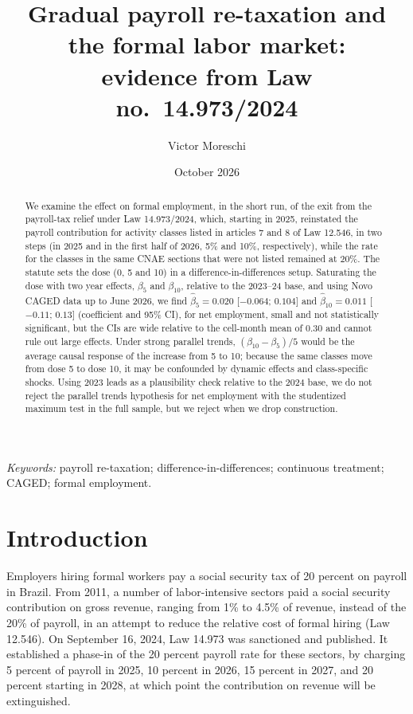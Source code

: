 \documentclass[12pt,a4paper]{article}
\title{Gradual payroll re-taxation and the formal labor market:\\evidence from Law no.\ 14.973/2024}
\author{Victor Moreschi}
\date{October 2026}
\begin{document}
\maketitle

\begin{abstract}
\noindent
We examine the effect on formal employment, in the short run, of the exit from the payroll-tax relief under Law 14.973/2024, which, starting in 2025, reinstated the payroll contribution for activity classes listed in articles 7 and 8 of Law 12.546, in two steps (in 2025 and in the first half of 2026, 5\% and 10\%, respectively), while the rate for the classes in the same CNAE sections that were not listed remained at 20\%. The statute sets the dose (0, 5 and 10) in a difference-in-differences setup. Saturating the dose with two year effects, $\beta_5$ and $\beta_{10}$, relative to the 2023--24 base, and using Novo CAGED data up to June 2026, we find $\hat\beta_5 = 0.020$ [$-0.064$; $0.104$] and $\hat\beta_{10} = 0.011$ [$-0.11$; $0.13$] (coefficient and 95\% CI), for net employment, small and not statistically significant, but the CIs are wide relative to the cell-month mean of 0.30 and cannot rule out large effects. Under strong parallel trends, $(\beta_{10}-\beta_5)/5$ would be the average causal response of the increase from 5 to 10; because the same classes move from dose 5 to dose 10, it may be confounded by dynamic effects and class-specific shocks. Using 2023 leads as a plausibility check relative to the 2024 base, we do not reject the parallel trends hypothesis for net employment with the studentized maximum test in the full sample, but we reject when we drop construction.
\end{abstract}
\noindent\textit{Keywords:} payroll re-taxation; difference-in-differences; continuous treatment; CAGED; formal employment.

\noindent{}
\section{Introduction}

Employers hiring formal workers pay a social security tax of 20 percent on payroll in Brazil. From 2011, a number of labor-intensive sectors paid a social security contribution on gross revenue, ranging from 1\% to 4.5\% of revenue, instead of the 20\% of payroll, in an attempt to reduce the relative cost of formal hiring (Law 12.546). On September 16, 2024, Law 14.973 was sanctioned and published. It established a phase-in of the 20 percent payroll rate for these sectors, by charging 5 percent of payroll in 2025, 10 percent in 2026, 15 percent in 2027, and 20 percent starting in 2028, at which point the contribution on revenue will be extinguished.
\end{document}
